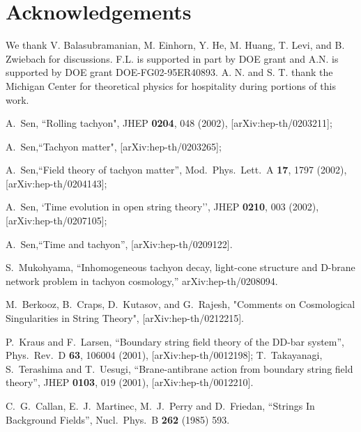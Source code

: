 \documentclass[a4paper,12pt]{article}
\begin{document}
\section*{Acknowledgements}
We thank V. Balasubramanian, M. Einhorn, Y. He, M. Huang, T. Levi, and B. Zwiebach for 
discussions. F.L. is supported in part by DOE grant and 
A.N. is supported by DOE grant DOE-FG02-95ER40893.
A. N. and S. T. thank the Michigan Center for theoretical physics for hospitality during 
portions of this work.


\begin{thebibliography}{99}

A.~Sen,
``Rolling tachyon",
JHEP {\bf 0204}, 048 (2002),
[arXiv:hep-th/0203211];

A.~Sen,``Tachyon matter",
[arXiv:hep-th/0203265];

A.~Sen,``Field theory of tachyon matter'',
Mod.\ Phys.\ Lett.\ A {\bf 17}, 1797 (2002),
[arXiv:hep-th/0204143];


A.~Sen,
`Time evolution in open string theory'',
JHEP {\bf 0210}, 003 (2002),
[arXiv:hep-th/0207105];

A.~Sen,``Time and tachyon'',
[arXiv:hep-th/0209122].








S.~Mukohyama,
``Inhomogeneous tachyon decay, light-cone structure and D-brane network  problem in tachyon cosmology,''
arXiv:hep-th/0208094.

M.~Berkooz, B.~Craps, D.~Kutasov, and G.~Rajesh,
"Comments on Cosmological Singularities in String Theory", 
[arXiv:hep-th/0212215].






P.~Kraus and F.~Larsen,
``Boundary string field theory of the DD-bar system'',
Phys.\ Rev.\ D {\bf 63}, 106004 (2001),
[arXiv:hep-th/0012198];
T.~Takayanagi, S.~Terashima and T.~Uesugi,
``Brane-antibrane action from boundary string field theory'',
JHEP {\bf 0103}, 019 (2001),
[arXiv:hep-th/0012210].

C.~G.~Callan, E.~J.~Martinec, M.~J.~Perry and D.~Friedan,
``Strings In Background Fields'',
Nucl.\ Phys.\ B {\bf 262} (1985) 593.



\end{thebibliography}
\end{document}
